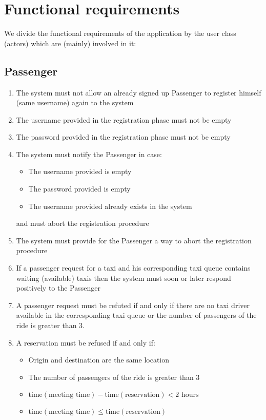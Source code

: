 \pagebreak
\section{Functional requirements}
We divide the functional requirements of the application by the user class (actors) which are (mainly) involved in it:
\subsection{Passenger}
\begin{enumerate}
\item The system must not allow an already signed up Passenger to register himself (same username) again to the system
\item The username provided in the registration phase must not be empty
\item The password provided in the registration phase must not be empty
\item The system must notify the Passenger in case: 
	\begin{itemize}
	\item The username provided is empty
	\item The password provided is empty
	\item The username provided already exists in the system
	\end{itemize}
	and must abort the registration procedure
\item The system must provide for the Passenger a way to abort the registration procedure
\item If a passenger request for a taxi and his corresponding taxi queue contains waiting (available) taxis then the system must soon or later respond positively to the Passenger
\item A passenger request must be refuted if and only if there are no taxi driver available in the corresponding taxi queue or the number of passengers of the ride is greater than 3.
\item A reservation must be refused if and only if:
\begin{itemize}
	\item Origin and destination are the same location
	\item The number of passengers of the ride is greater than 3
	\item $\text{time}(\text{meeting time}) - \text{time}(\text{reservation}) < \text{2 hours}$
	\item $\text{time}(\text{meeting time}) \leq \text{time}(\text{reservation})$
\end{itemize}
\end{enumerate}


